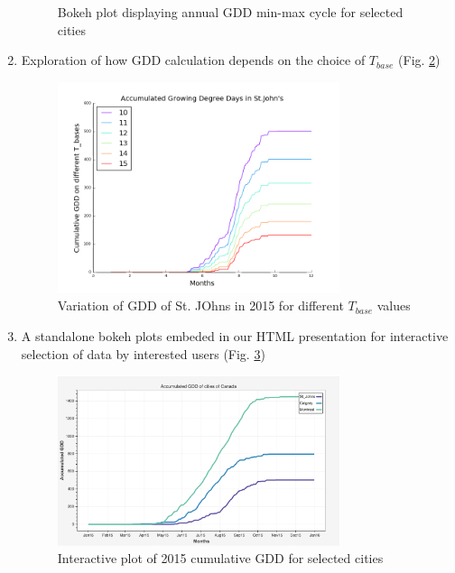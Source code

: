 \documentclass{article}
\begin{document}
\begin{enumerate}
\begin{center}
\begin{figure}[!htb]
\caption{Bokeh plot displaying annual GDD min-max cycle for selected cities}
\label{bokeh_min-max}
\end{figure}
\end{center}
\item Exploration of how GDD calculation depends on the choice of $T_{base}$ (Fig. \ref{gdd_diff-tbase})
\begin{center}
\begin{figure}[!htb]
\includegraphics[width=3.25in]{./source/Report/op3.png}
\caption{Variation of GDD of St. JOhns in 2015 for different $T_{base}$ values}
\label{gdd_diff-tbase}
\end{figure}
\end{center}

\item A standalone bokeh plots embeded in our HTML presentation for interactive selection of data by interested users (Fig. \ref{gdd_interactive})
\begin{center}
\begin{figure}[!htb]
\includegraphics[width=3.25in]{./source/Report/op-task_4.png}
\caption{Interactive plot of 2015 cumulative GDD for selected cities}
\label{gdd_interactive}
\end{figure}
\end{center}


\end{enumerate}
\end{document}
